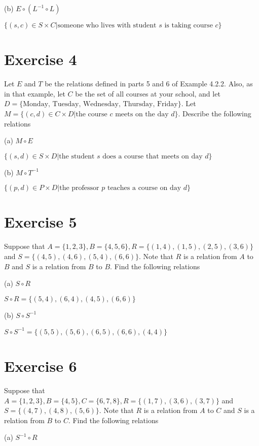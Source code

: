 \documentclass[11pt]{article}
\begin{document}
\noindent (b) $E \circ (L^{-1} \circ L)$

$\{(s,c) \in S \times C | \text{someone who lives with student } s \text{ is taking course } c\}$

\section*{Exercise 4}

Let $E$ and $T$ be the relations defined in parts 5 and 6 of Example 4.2.2.
Also, as in that example, let $C$ be the set of all courses at your school, and 
let $D = \{ \text{Monday, Tuesday, Wednesday, Thursday, Friday}\}$. Let 
$M = \{(c, d) \in C \times D | \text{the course } c \text{ meets on the day } d\}$.
Describe the following relations

\noindent (a) $M \circ E$ 

$\{(s,d) \in S \times D | \text{the student } s \text{ does a course that meets on day } d\}$

\noindent (b) $M \circ T^{-1}$

$\{(p,d) \in P \times D | \text{the professor } p \text{ teaches a course on day } d\}$

\section*{Exercise 5}

Suppose that $A = \{1,2,3\}, B = \{4,5,6\}, R = \{(1,4),(1,5),(2,5),(3,6)\}$ and 
$S = \{(4,5),(4,6),(5,4),(6,6)\}$. Note that $R$ is a relation from $A$ to $B$ 
and $S$ is a relation from $B$ to $B$. Find the following relations 

\noindent (a) $S \circ R$

$S \circ R = \{(5,4),(6,4),(4,5),(6,6)\}$

\noindent (b) $S \circ S^{-1}$

$S \circ S^{-1} = \{(5,5),(5,6),(6,5),(6,6),(4,4)\}$

\section*{Exercise 6}

Suppose that $A = \{1,2,3\}, B = \{4,5\}, C = \{6,7,8\}, R = \{(1,7), (3,6), (3,7)\}$
and $S = \{(4,7), (4,8), (5,6)\}$. Note that $R$ is a relation from $A$ to $C$ 
and $S$ is a relation from $B$ to $C$. Find the following relations 

\noindent (a) $S^{-1} \circ R$ 
\end{document}
